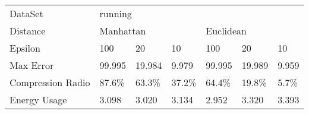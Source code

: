 \documentclass[10pt, conference, compsocconf]{IEEEtran}
\begin{document}
\begin{table}[]
\begin{tabular}{lllllll}
DataSet           & \multicolumn{6}{l}{running}                                   \\
Distance          & \multicolumn{3}{l}{Manhattan} & \multicolumn{3}{l}{Euclidean} \\
Epsilon           & 100      & 20       & 10      & 100      & 20       & 10      \\
Max Error         & 99.995   & 19.984   & 9.979   & 99.995   & 19.989   & 9.959   \\
Compression Radio & 87.6\%   & 63.3\%   & 37.2\%  & 64.4\%   & 19.8\%   & 5.7\%   \\
Energy Usage      & 3.098    & 3.020    & 3.134   & 2.952    & 3.320    & 3.393
\end{tabular}
\end{table}




\end{document}
